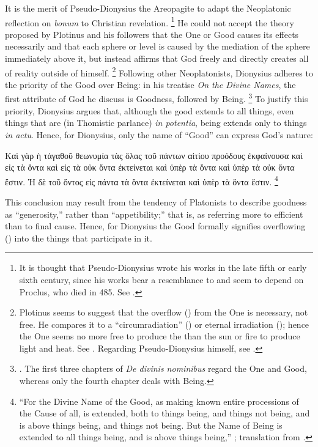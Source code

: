 {It is the merit of Pseudo-Dionysius the Areopagite to adapt the Neoplatonic reflection on \emph{bonum} to Christian revelation.%
%
\footnote{It is thought that Pseudo-Dionysius wrote his works in the late fifth or early sixth century, since his works bear a resemblance to and seem to depend on Proclus, who died in 485. See \cite[§~1]{stanford:pseudo-dionysius}.}
%
He could not accept the theory proposed by Plotinus and his followers that the One or Good causes its effects necessarily and that each sphere or level is caused by the mediation of the sphere immediately above it, but instead affirms that God freely and directly creates all of reality outside of himself.%
%
\footnote{Plotinus seems to suggest that the overflow () from the One is necessary, not free. He compares it to a ``circumradiation'' () or eternal irradiation (); hence the One seems no more free to produce the  than the sun or fire to produce light and heat. See \cite[V,~1,~6, and V,~3,~12]{plotinus:enneads}. Regarding Pseudo-Dionysius himself, see \cite[§~4.1]{stanford:pseudo-dionysius}.}
%
Following other Neoplatonists, Dionysius adheres to the priority of the Good over Being: in his treatise \emph{On the Divine Names}, the first attribute of God he discuss is Goodness, followed by Being.%
%
\footnote{\cite[See][65--66]{orourke:pseudo-dionysius}. The first three chapters of \emph{De divinis nominibus} regard the One and Good, whereas only the fourth chapter deals with Being.}
%
To justify this priority, Dionysius argues that, although the good extends to all things, even things that are (in Thomistic parlance) \emph{in potentia}, being extends only to things \emph{in actu}. Hence, for Dionysius, only the name of \enquote{Good} can express God's nature:
%
\begin{greekQuotation}
Καὶ γὰρ ἡ τἀγαθοῦ θεωνυμία τὰς ὅλας τοῦ πάντων αἰτίου προόδους ἐκφαίνουσα καὶ εἰς τὰ ὄντα καὶ εἰς τὰ οὐκ ὄντα ἐκτείνεται καὶ ὑπὲρ τὰ ὄντα καὶ ὑπὲρ τὰ οὐκ ὄντα ἔστιν. Ἡ δὲ τοῦ ὄντος εἰς πάντα τὰ ὄντα ἐκτείνεται καὶ ὑπὲρ τὰ ὄντα ἔστιν.%
%
\footnote{\enquote{For the Divine Name of the Good, as making known entire processions of the Cause of all, is extended, both to things being, and things not being, and is above things being, and things not being. But the Name of Being is extended to all things being, and is above things being,} \cite[V, 1]{pg:dionysius:DN}; translation from \cite[73]{pg:dionysius:DN:en}.}
%
\end{greekQuotation}
%
This conclusion may result from the tendency of Platonists to describe goodness as \enquote{generosity,} rather than \enquote{appetibility;} that is, as referring more to efficient than to final cause. Hence, for Dionysius the Good formally signifies overflowing () into the things that participate in it.%
}
